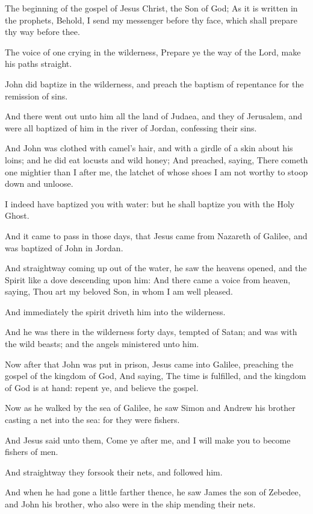 \Chapter
\Verse The beginning of the gospel of Jesus Christ, the Son of God; \Verse As it is written in the prophets, Behold, I send my messenger before thy face, which shall prepare thy way before thee.

\Verse The voice of one crying in the wilderness, Prepare ye the way of the Lord, make his paths straight.

\Verse John did baptize in the wilderness, and preach the baptism of repentance for the remission of sins.

\Verse And there went out unto him all the land of Judaea, and they of Jerusalem, and were all baptized of him in the river of Jordan, confessing their sins.

\Verse And John was clothed with camel's hair, and with a girdle of a skin about his loins; and he did eat locusts and wild honey; \Verse And preached, saying, There cometh one mightier than I after me, the latchet of whose shoes I am not worthy to stoop down and unloose.

\Verse I indeed have baptized you with water: but he shall baptize you with the Holy Ghost.

\Verse And it came to pass in those days, that Jesus came from Nazareth of Galilee, and was baptized of John in Jordan.

\Verse And straightway coming up out of the water, he saw the heavens opened, and the Spirit like a dove descending upon him: \Verse And there came a voice from heaven, saying, Thou art my beloved Son, in whom I am well pleased.

\Verse And immediately the spirit driveth him into the wilderness.

\Verse And he was there in the wilderness forty days, tempted of Satan; and was with the wild beasts; and the angels ministered unto him.

\Verse Now after that John was put in prison, Jesus came into Galilee, preaching the gospel of the kingdom of God, \Verse And saying, The time is fulfilled, and the kingdom of God is at hand: repent ye, and believe the gospel.

\Verse Now as he walked by the sea of Galilee, he saw Simon and Andrew his brother casting a net into the sea: for they were fishers.

\Verse And Jesus said unto them, Come ye after me, and I will make you to become fishers of men.

\Verse And straightway they forsook their nets, and followed him.

\Verse And when he had gone a little farther thence, he saw James the son of Zebedee, and John his brother, who also were in the ship mending their nets.

